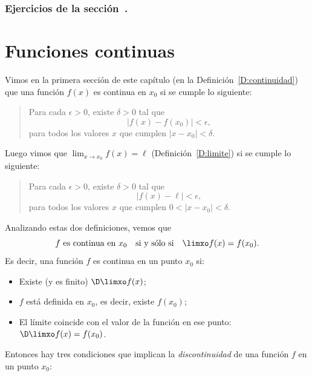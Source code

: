 \subsubsection*{Ejercicios de la sección~.}

\begin{enumerate}

\end{enumerate}

\section{Funciones continuas}

Vimos en la primera sección de este capítulo (en la Definición~\ref{D:continuidad}) que
una función $f(x)$ es continua en $x_0$ si se cumple lo siguiente:
    \begin{quote}
        Para cada $\epsilon > 0$, existe $\delta > 0$ tal que
        \[ 
        |f(x) - f(x_0)| < \epsilon,
        \]
        para todos los valores $x$ que cumplen $|x-x_0|<\delta$.
    \end{quote}

Luego vimos que $\lim_{x\to x_0} f(x) = \ell$ (Definición~\ref{D:limite}) si se cumple lo siguiente:
    \begin{quote}
        Para cada $\epsilon > 0$, existe $\delta > 0$ tal que
        \[ 
        |f(x) - \ell| < \epsilon,
        \]
        para todos los valores $x$ que cumplen $0<|x-x_0|<\delta$.
    \end{quote}

Analizando estas dos definiciones, vemos que
\[
f \text{ es continua en $x_0$}
\quad\text{si y sólo si}\quad
\limxo f(x) = f(x_0).
\]
Es decir, una función $f$ es continua en un punto $x_0$ si:
\begin{itemize}
    \item Existe (y es finito) $\D\limxo f(x)$;
    \item $f$ está definida en $x_0$, es decir, existe $f(x_0)$;
    \item El límite coincide con el valor de la función en ese punto: $\D\limxo f(x)=f(x_0)$.
\end{itemize}

Entonces hay tres condiciones que implican la \emph{discontinuidad} de una función $f$ en un punto $x_0$:

